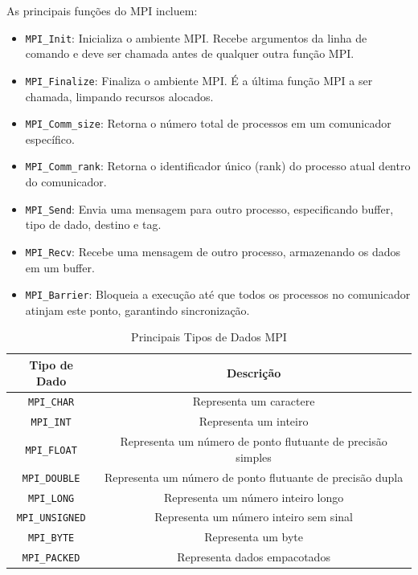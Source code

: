 \documentclass[12pt]{article}
\begin{document}
As principais funções do MPI incluem:
\begin{itemize}
    \item \texttt{MPI\_Init}: Inicializa o ambiente MPI. Recebe argumentos da linha de comando e deve ser chamada antes de qualquer outra função MPI.
    \item \texttt{MPI\_Finalize}: Finaliza o ambiente MPI. É a última função MPI a ser chamada, limpando recursos alocados.
    \item \texttt{MPI\_Comm\_size}: Retorna o número total de processos em um comunicador específico.
    \item \texttt{MPI\_Comm\_rank}: Retorna o identificador único (rank) do processo atual dentro do comunicador.
    \item \texttt{MPI\_Send}: Envia uma mensagem para outro processo, especificando buffer, tipo de dado, destino e tag.
    \item \texttt{MPI\_Recv}: Recebe uma mensagem de outro processo, armazenando os dados em um buffer.
    \item \texttt{MPI\_Barrier}: Bloqueia a execução até que todos os processos no comunicador atinjam este ponto, garantindo sincronização.
\end{itemize}

\begin{table}[ht]
    \centering
    \caption{Principais Tipos de Dados MPI}
    \begin{tabular}{|c|c|}
        \hline
        \textbf{Tipo de Dado} & \textbf{Descrição} \\
        \hline
        \texttt{MPI\_CHAR} & Representa um caractere \\
        \hline
        \texttt{MPI\_INT} & Representa um inteiro \\
        \hline
        \texttt{MPI\_FLOAT} & Representa um número de ponto flutuante de precisão simples \\
        \hline
        \texttt{MPI\_DOUBLE} & Representa um número de ponto flutuante de precisão dupla \\
        \hline
        \texttt{MPI\_LONG} & Representa um número inteiro longo \\
        \hline
        \texttt{MPI\_UNSIGNED} & Representa um número inteiro sem sinal \\
        \hline
        \texttt{MPI\_BYTE} & Representa um byte \\
        \hline
        \texttt{MPI\_PACKED} & Representa dados empacotados \\
        \hline
    \end{tabular}
    \label{tab:mpi_data_types}
\end{table}
\end{document}
